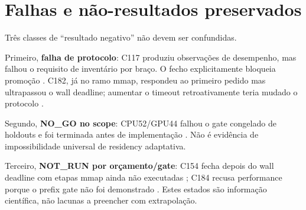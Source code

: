 \section{Falhas e não-resultados preservados}
Três classes de “resultado negativo” não devem ser confundidas.

Primeiro, \textbf{falha de protocolo}: C117 produziu observações de desempenho, mas falhou o requisito de inventário por braço. O fecho explicitamente bloqueia promoção . C182, já no ramo mmap, respondeu ao primeiro pedido mas ultrapassou o wall deadline; aumentar o timeout retroativamente teria mudado o protocolo .

Segundo, \textbf{NO\_GO no scope}: CPU52/GPU44 falhou o gate congelado de holdouts e foi terminada antes de implementação . Não é evidência de impossibilidade universal de residency adaptativa.

Terceiro, \textbf{NOT\_RUN por orçamento/gate}: C154 fecha depois do wall deadline com etapas mmap ainda não executadas ; C184 recusa performance porque o prefix gate não foi demonstrado . Estes estados são informação científica, não lacunas a preencher com extrapolação.
